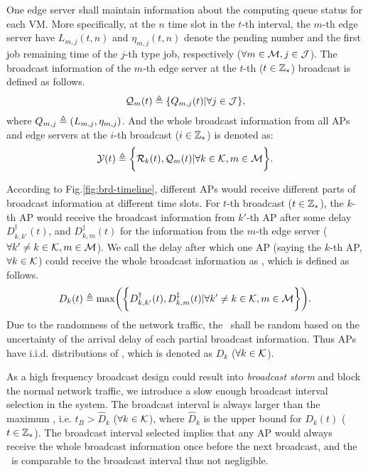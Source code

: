 One edge server shall maintain information about the computing queue status for each VM.
More specifically, at the $n$ time slot in the $t$-th interval, the $m$-th edge server have $L_{m,j}({t,n})$ and $\eta_{m,j}({t,n})$ denote the pending number and the first job remaining time of the $j$-th type job, respectively ($\forall m\in\mathcal{M}, j\in\mathcal{J}$).
The broadcast information of the $m$-th edge server at the $t$-th ($t\in\mathbb{Z}_{*}$) broadcast is defined as follows.
\begin{align}
    \mathcal{Q}_{m}({t}) \triangleq \{Q_{m,j}({t}) | \forall j\in\mathcal{J}\},
\end{align}
where $Q_{m,j} \triangleq (L_{m,j}, \eta_{m,j})$.
And the whole broadcast information from all APs and edge servers at the $i$-th broadcast ($i\in\mathbb{Z}_{*}$) is denoted as:
\begin{align}
    \mathcal{Y}({t}) \triangleq
        \bigg\{
            \mathcal{R}_{k}({t}), \mathcal{Q}_{m}({t}) | \forall k\in\mathcal{K}, m\in\mathcal{M}
        \bigg\}.
\end{align}

According to Fig.\ref{fig:brd-timeline}, different APs would receive different parts of broadcast information at different time slots.
For $t$-th broadcast ($t\in\mathbb{Z}_{*}$), the $k$-th AP would receive the broadcast information from $k'$-th AP after some delay $D^{\dagger}_{k,k'}({t})$, and $D^{\ddagger}_{k,m}({t})$ for the information from the $m$-th edge server ($\forall k' \neq k \in\mathcal{K}, m\in\mathcal{M}$).
We call the delay after which one AP (saying the $k$-th AP, $\forall k\in\mathcal{K}$) could receive the whole broadcast information as \brdelay, which is defined as follows.
\begin{align}
    D_{k}({t}) \define \max\Paren{\Brace{
        D^{\dagger}_{k,k'}({t}),
        D^{\ddagger}_{k,m}({t}) | \forall k' \neq k \in \apSet, m\in\esSet
    }}.
\end{align}
Due to the randomness of the network traffic, the \brdelay~shall be random based on the uncertainty of the arrival delay of each partial broadcast information.
Thus APs have i.i.d. distributions of \brdelay, which is denoted as $D_{k}$ ($\forall k \in \mathcal{K}$).

As a high frequency broadcast design could result into \emph{broadcast storm} and block the normal network traffic, we introduce a slow enough broadcast interval selection in the system.
The broadcast interval is always larger than the maximum \brdelay, i.e. $t_B > \hat{D}_k$ ($\forall k\in\mathcal{K}$), where $\hat{D}_k$ is the upper bound for $D_{k}({t})$ ($t\in\mathbb{Z}_{*}$).
The broadcast interval selected implies that any AP would always receive the whole broadcast information once before the next broadcast, and the \brdelay~is comparable to the broadcast interval thus not negligible.

